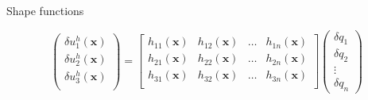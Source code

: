 \documentclass[aspectratio=169]{beamer}
\begin{document}
{\begin{frame}{Shape functions}
{\begin{block}{}
        $$
          \begin{pmatrix}
            \delta u_{1}^{h}(\mathbf x) \\
            \delta u_{2}^{h}(\mathbf x) \\
            \delta u_{3}^{h}(\mathbf x) \\
          \end{pmatrix}
          =
          \begin{bmatrix}
            h_{11}(\mathbf x) & h_{12}(\mathbf x) & \dots & h_{1n}(\mathbf x) \\
            h_{21}(\mathbf x) & h_{22}(\mathbf x) & \dots & h_{2n}(\mathbf x) \\
            h_{31}(\mathbf x) & h_{32}(\mathbf x) & \dots & h_{3n}(\mathbf x) \\
          \end{bmatrix}
          \begin{pmatrix}
            \delta  q_{1} \\
            \delta q_{2}  \\
            \vdots        \\
            \delta  q_{n}
          \end{pmatrix}
        $$
      \end{block}
    }
\end{frame}
}
\end{document}
